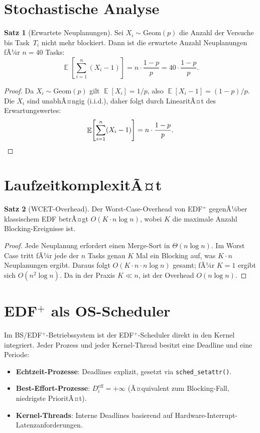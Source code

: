 ﻿\documentclass[a4paper,12pt]{scrreprt}
\theoremstyle{definition}
\newtheorem{satz}{Satz}[chapter]
\DeclareMathOperator{\E}{\mathbb{E}}
\begin{document}
	\section{Stochastische Analyse}
	
	\begin{satz}[Erwartete Neuplanungen]\label{satz:reprob}
		Sei $X_i \sim \mathrm{Geom}(p)$ die Anzahl der Versuche bis Task~$T_i$
		nicht mehr blockiert. Dann ist die erwartete Anzahl Neuplanungen fÃ¼r
		$n = 40$ Tasks:
		\[
		\E\!\left[\sum_{i=1}^{n} (X_i - 1)\right]
		= n \cdot \frac{1-p}{p}
		= 40 \cdot \frac{1-p}{p}.
		\]
	\end{satz}
	
	\begin{proof}
		Da $X_i \sim \mathrm{Geom}(p)$ gilt $\E[X_i] = 1/p$, also
		$\E[X_i - 1] = (1-p)/p$. Die $X_i$ sind unabhÃ¤ngig (i.i.d.), daher
		folgt durch LinearitÃ¤t des Erwartungswertes:
		\[
		\E\!\left[\sum_{i=1}^{n}(X_i-1)\right]
		= n \cdot \frac{1-p}{p}. \qedhere
		\]
	\end{proof}
	
	\section{LaufzeitkomplexitÃ¤t}
	
	\begin{satz}[WCET-Overhead]\label{satz:wcet}
		Der Worst-Case-Overhead von EDF$^+$ gegenÃ¼ber klassischem EDF betrÃ¤gt
		$O(K \cdot n \log n)$, wobei $K$ die maximale Anzahl Blocking-Ereignisse
		ist.
	\end{satz}
	
	\begin{proof}
		Jede Neuplanung erfordert einen Merge-Sort in $\Theta(n \log n)$. Im
		Worst Case tritt fÃ¼r jede der $n$ Tasks genau $K$ Mal ein Blocking auf,
		was $K \cdot n$ Neuplanungen ergibt. Daraus folgt
		$O(K \cdot n \cdot n \log n)$ gesamt; fÃ¼r $K = 1$ ergibt sich
		$O(n^2 \log n)$. Da in der Praxis $K \ll n$, ist der Overhead $O(n \log n)$.
	\end{proof}
	
	\section{\texorpdfstring{EDF$^+$}{EDF+} als OS-Scheduler}

	Im BS/EDF$^+$-Betriebssystem ist der EDF$^+$-Scheduler direkt in den
	Kernel integriert. Jeder Prozess und jeder Kernel-Thread besitzt eine
	Deadline und eine Periode:
	\begin{itemize}
		\item \textbf{Echtzeit-Prozesse}: Deadlines explizit, gesetzt via
		\texttt{sched\_setattr()}.
		\item \textbf{Best-Effort-Prozesse}: $D_i^{\mathrm{eff}} = +\infty$
		(Ã¤quivalent zum Blocking-Fall, niedrigste PrioritÃ¤t).
		\item \textbf{Kernel-Threads}: Interne Deadlines basierend auf
		Hardware-Interrupt-Latenzanfor\-derungen.
	\end{itemize}
\end{document}
